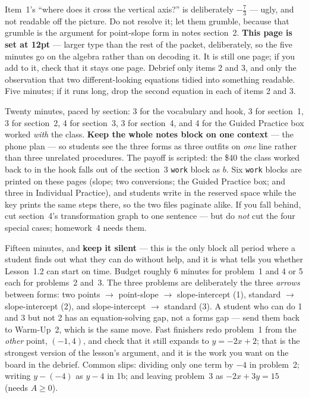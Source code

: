 \documentclass[10pt]{article}
\begin{document}
\begin{teachernote}[Warm-Up]
Item~1's ``where does it cross the vertical axis?'' is deliberately $-\tfrac73$ --- ugly, and not
readable off the picture. Do not resolve it; let them grumble, because that grumble is the argument
for point-slope form in notes section~2. \textbf{This page is set at 12pt} --- larger type than the
rest of the packet, deliberately, so the five minutes go on the algebra rather than on decoding it.
It is still one page; if you add to it, check that it stays one page. Debrief only items 2 and 3, and only the
observation that two different-looking equations tidied into something readable. Five minutes; if it
runs long, drop the second equation in each of items 2 and 3.
\end{teachernote}

\begin{teachernote}
Twenty minutes, paced by section: 3 for the vocabulary and hook, 3 for section~1, 3 for section~2,
4 for section~3, 3 for section~4, and 4 for the Guided Practice box worked \emph{with} the class. \textbf{Keep the whole notes block on one context} --- the phone
plan --- so students see the three forms as three outfits on \emph{one} line rather than three
unrelated procedures. The payoff is scripted: the \$40 the class worked back to in the hook falls out
of the section~3 \texttt{work} block as $b$. Six \texttt{work} blocks are printed on these pages (slope; two conversions; the Guided Practice
box; and three in Individual Practice), and students write in the reserved space while the key
prints the same steps there, so the two files paginate alike. If you fall behind, cut section~4's transformation
graph to one sentence --- but do \emph{not} cut the four special cases; homework~4 needs them.
\end{teachernote}

\begin{teachernote}
Fifteen minutes, and \textbf{keep it silent} --- this is the only block all period where a student
finds out what they can do without help, and it is what tells you whether Lesson~1.2 can start on
time. Budget roughly 6 minutes for problem~1 and 4 or 5 each for problems~2 and~3. The three
problems are deliberately the three \emph{arrows} between forms: two points $\to$ point-slope $\to$
slope-intercept (1), standard $\to$ slope-intercept (2), and slope-intercept $\to$ standard (3). A
student who can do 1 and 3 but not 2 has an equation-solving gap, not a forms gap --- send them back
to Warm-Up~2, which is the same move. Fast finishers redo problem~1 from the \emph{other} point,
$(-1,4)$, and check that it still expands to $y=-2x+2$; that is the strongest version of the
lesson's argument, and it is the work you want on the board in the debrief. Common slips: dividing
only one term by $-4$ in problem~2; writing $y-(-4)$ as $y-4$ in 1b; and leaving problem~3 as
$-2x+3y=15$ (needs $A\ge0$).
\end{teachernote}
\end{document}
